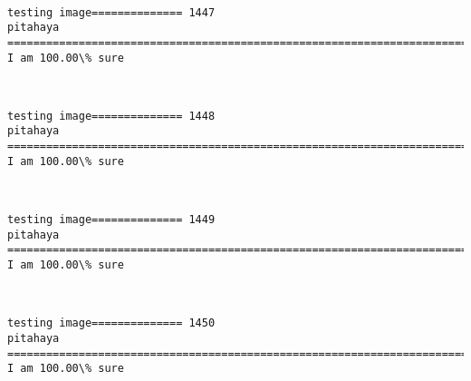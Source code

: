 \documentclass[11pt]{article}
\begin{document}
    \begin{center}
    \end{center}
    { \hspace*{\fill} \\}
    
    \begin{Verbatim}[commandchars=\\\{\}]
testing image============== 1447
pitahaya
============================================================================
I am 100.00\% sure

    \end{Verbatim}

    \begin{center}
    \end{center}
    { \hspace*{\fill} \\}
    
    \begin{Verbatim}[commandchars=\\\{\}]
testing image============== 1448
pitahaya
============================================================================
I am 100.00\% sure

    \end{Verbatim}

    \begin{center}
    \end{center}
    { \hspace*{\fill} \\}
    
    \begin{Verbatim}[commandchars=\\\{\}]
testing image============== 1449
pitahaya
============================================================================
I am 100.00\% sure

    \end{Verbatim}

    \begin{center}
    \end{center}
    { \hspace*{\fill} \\}
    
    \begin{Verbatim}[commandchars=\\\{\}]
testing image============== 1450
pitahaya
============================================================================
I am 100.00\% sure

    \end{Verbatim}
\end{document}
